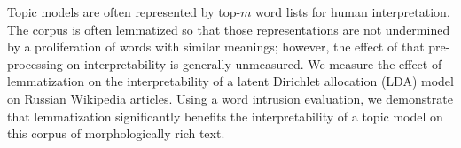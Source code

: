 Topic models are often represented by top-$m$ word lists for human
interpretation.  The corpus is often lemmatized
so that those representations are not undermined by a proliferation of
words with similar meanings; however, the effect of that pre-processing
on interpretability is generally unmeasured.
We measure the effect of lemmatization on the interpretability of a
latent Dirichlet allocation (LDA) model on Russian Wikipedia
articles.  Using a word intrusion evaluation, we
demonstrate that lemmatization significantly benefits
the interpretability of a topic model on this corpus of morphologically
rich text.
